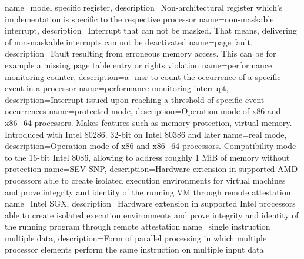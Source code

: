 {
    name=model specific register,
    description={Non-architectural register which's implementation is specific to the respective processor}
}
%
{
    name=non-maskable interrupt,
    description={Interrupt that can not be masked. That means, delivering of non-maskable interrupts can not be
            deactivated}
}
%
{
    name=page fault,
    description={Fault resulting from erroneous memory access. This can be for example a missing page table entry or
            rights violation }
}
{
    name=performance monitoring counter,
    description={\acrshort{a_msr} to count the occurrence of a specific event in a processor}
}
{
    name=performance monitoring interrupt,
    description={Interrupt issued upon reaching a threshold of specific event occurrences}
}
{
    name=protected mode,
    description={Operation mode of x86 and x86\_64 processors. Makes features such as memory protection, virtual memory.
            Introduced with Intel 80286. 32-bit on Intel 80386 and later}
}
%
{
    name=real mode,
    description={Operation mode of x86 and x86\_64 processors. Compatibility mode to the 16-bit Intel 8086, allowing to
            address roughly 1 MiB of memory without protection}
}
%
{
    name=SEV-SNP,
    description={Hardware extension in supported AMD processors able to create isolated execution environments for
            virtual machines and prove integrity and identity of the running VM through remote attestation}
}
{
    name=Intel SGX,
    description={Hardware extension in supported Intel processors able to create isolated execution environments and
            prove integrity and identity of the running program through remote attestation}
}
{
    name={single instruction multiple data},
    description={Form of parallel processing in which multiple processor elements perform the same instruction on
            multiple input data}
}
